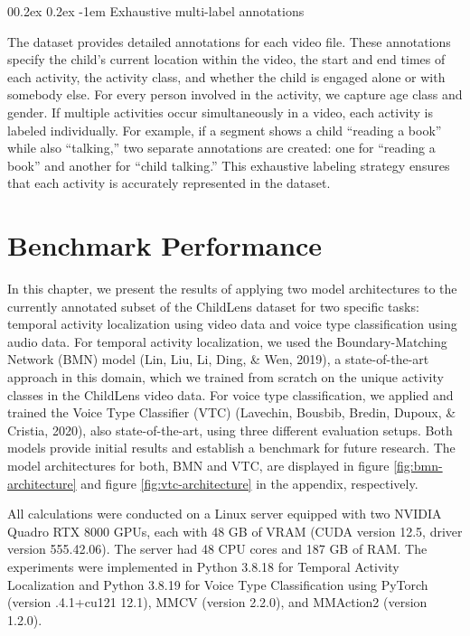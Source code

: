 \documentclass[
  man,floatsintext]{apa6}
\makeatletter
\let\oldparagraph\paragraph
\renewcommand{\paragraph}{
    \@ifstar
      \xxxParagraphStar
      \xxxParagraphNoStar
  }
\newcommand{\xxxParagraphStar}[1]{\oldparagraph*{#1}\mbox{}}
\newcommand{\xxxParagraphNoStar}[1]{\oldparagraph{#1}\mbox{}}
\renewcommand{\paragraph}{\@startsection{paragraph}{4}{\parindent}%
  {0\baselineskip \@plus 0.2ex \@minus 0.2ex}%
  {-1em}%
  {\normalfont\normalsize\bfseries\itshape\typesectitle}}
\makeatother
\begin{document}
\paragraph{Exhaustive multi-label annotations}\label{exhaustive-multi-label-annotations}

The dataset provides detailed annotations for each video file. These annotations specify the child's current location within the video, the start and end times of each activity, the activity class, and whether the child is engaged alone or with somebody else. For every person involved in the activity, we capture age class and gender. If multiple activities occur simultaneously in a video, each activity is labeled individually. For example, if a segment shows a child ``reading a book'' while also ``talking,'' two separate annotations are created: one for ``reading a book'' and another for ``child talking.'' This exhaustive labeling strategy ensures that each activity is accurately represented in the dataset.

\section{Benchmark Performance}\label{benchmark-performance}

In this chapter, we present the results of applying two model architectures to the currently annotated subset of the ChildLens dataset for two specific tasks: temporal activity localization using video data and voice type classification using audio data. For temporal activity localization, we used the Boundary-Matching Network (BMN) model (Lin, Liu, Li, Ding, \& Wen, 2019), a state-of-the-art approach in this domain, which we trained from scratch on the unique activity classes in the ChildLens video data. For voice type classification, we applied and trained the Voice Type Classifier (VTC) (Lavechin, Bousbib, Bredin, Dupoux, \& Cristia, 2020), also state-of-the-art, using three different evaluation setups. Both models provide initial results and establish a benchmark for future research. The model architectures for both, BMN and VTC, are displayed in figure \ref{fig:bmn-architecture} and figure \ref{fig:vtc-architecture} in the appendix, respectively.

All calculations were conducted on a Linux server equipped with two NVIDIA Quadro RTX 8000 GPUs, each with 48 GB of VRAM (CUDA version 12.5, driver version 555.42.06). The server had 48 CPU cores and 187 GB of RAM. The experiments were implemented in Python 3.8.18 for Temporal Activity Localization and Python 3.8.19 for Voice Type Classification using PyTorch (version .4.1+cu121 12.1), MMCV (version 2.2.0), and MMAction2 (version 1.2.0).
\end{document}
